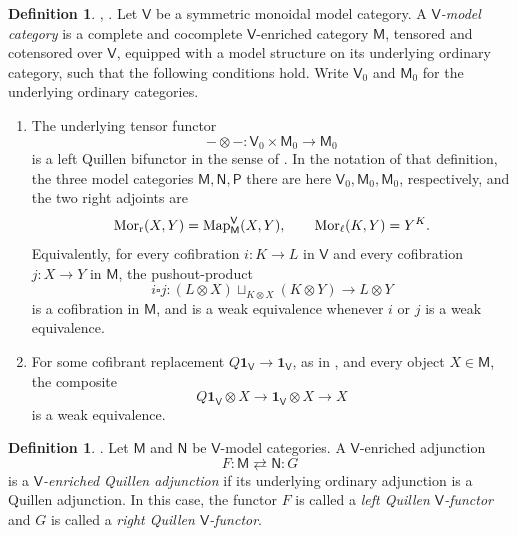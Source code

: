 \documentclass{amsart}
\newcommand{\cat}[1]{\mathsf{#1}}
\newcommand{\Mor}{\textnormal{Mor}}
\newcommand{\unit}{\mathbf{1}}
\newcommand{\Map}{\mathrm{Map}}
\theoremstyle{definition}
\newtheorem{definition}[equation]{Definition}
\numberwithin{equation}{subsection}
\numberwithin{subsubsection}{subsection}
\begin{document}
\begin{definition}\label{def:v.model.category}
  \textnormal{\cite[Definition~4.2.18]{Hov99}},
  \textnormal{\cite[Definition~1.27.4]{Bar10}}.
  Let \(\cat{V}\) be a symmetric monoidal model category. A
  \emph{\(\cat{V}\)-model category} is a complete and cocomplete
  \(\cat{V}\)-enriched category \(\cat{M}\), tensored and cotensored over
  \(\cat{V}\), equipped with a model structure on its underlying ordinary
  category, such that the following conditions hold.
  Write \(\cat{V}_{0}\) and \(\cat{M}_{0}\) for the underlying ordinary
  categories.
  \begin{enumerate}
    \item The underlying tensor functor
      \[
        -\otimes-:
        \cat{V}_{0}\times\cat{M}_{0}
        \longrightarrow
        \cat{M}_{0}
      \]
      is a left Quillen bifunctor in the sense of
      . In the notation of that definition, the
      three model categories \(\cat{M},\cat{N},\cat{P}\) there are here
      \(\cat{V}_{0},\cat{M}_{0},\cat{M}_{0}\), respectively, and the two right
      adjoints are
      \[
        \Mor_{\mathrm{r}}(X,Y)
        =
        \Map_{\cat{M}}^{\cat{V}}(X,Y),
        \qquad
        \Mor_{\mathrm{\ell}}(K,Y)
        =
        Y^{K}.
      \]
      Equivalently, for every cofibration \(i:K\to L\) in \(\cat{V}\)
      and every cofibration \(j:X\to Y\) in \(\cat{M}\), the
      pushout-product
      \[
        i\square j:
        (L\otimes X)\sqcup_{K\otimes X}(K\otimes Y)
        \longrightarrow
        L\otimes Y
      \]
      is a cofibration in \(\cat{M}\), and is a weak equivalence whenever
      \(i\) or \(j\) is a weak equivalence.
    \item For some cofibrant replacement
      \(Q\unit_{\cat{V}}\to\unit_{\cat{V}}\), as in
      , and every object
      \(X\in\cat{M}\), the composite
      \[
        Q\unit_{\cat{V}}\otimes X
        \longrightarrow
        \unit_{\cat{V}}\otimes X
        \longrightarrow
        X
      \]
      is a weak equivalence.
  \end{enumerate}
\end{definition}

\begin{definition}\label{def:v.quillen.adjunction}
  \textnormal{\cite[Definition~1.27.6]{Bar10}}.
  Let \(\cat{M}\) and \(\cat{N}\) be \(\cat{V}\)-model categories. A
  \(\cat{V}\)-enriched adjunction
  \[
    F:\cat{M}\rightleftarrows\cat{N}:G
  \]
  is a \emph{\(\cat{V}\)-enriched Quillen adjunction} if its underlying
  ordinary adjunction is a Quillen adjunction. In this case, the functor \(F\)
  is called
  a \emph{left Quillen \(\cat{V}\)-functor} and \(G\) is called a \emph{right
    Quillen
  \(\cat{V}\)-functor}.
\end{definition}
\end{document}
